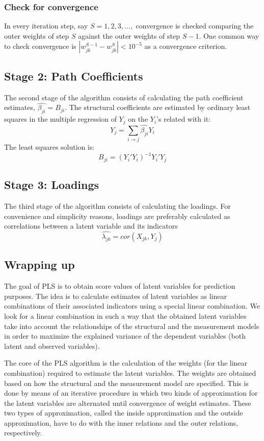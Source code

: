 \documentclass[12pt]{book}\usepackage{graphicx, color}
\begin{document}
\subsubsection*{Check for convergence}
In every iteration step, say $S = 1, 2, 3, \dots, $ convergence is checked comparing the outer weights of step $S$ against the outer weights of step $S-1$. One common way to check convergence is
$|w_{jk}^{S-1} - w_{jk}^{S}| < 10^{-5}$
as a convergence criterion.



\subsection{Stage 2: Path Coefficients}
The second stage of the algorithm consists of calculating the path coefficient estimates, $\widehat{\beta_{ji}} = B_{ji}$. The structural coefficients are estimated by ordinary least squares in the multiple regression of $Y_j$ on the $Y_i$'s related with it: 
$$ Y_j = \sum_{i \longrightarrow j} \widehat{\beta_{ji}} Y_i $$
The least squares solution is:
$$ B_{ji} = (Y_i' Y_i)^{-1} Y_i' Y_j $$


\subsection{Stage 3: Loadings}
The third stage of the algorithm consists of calculating the loadings. For convenience and simplicity reasons, loadings are preferably calculated as correlations between a latent variable and its indicators
$$ \widehat{\lambda_{jk}} = cor(X_{jk}, Y_j) $$



\subsection{Wrapping up}
The goal of PLS is to obtain score values of latent variables for prediction purposes. The idea is to calculate estimates of latent variables as linear combinations of their associated indicators using a special linear combination. We look for a linear combination in such a way that the obtained latent variables take into account the relationships of the structural and the measurement models in order to maximize the explained variance of the dependent variables (both latent and observed variables). 

The core of the PLS algorithm is the calculation of the weights (for the linear combination) required to estimate the latent variables. The weights are obtained based on how the structural and the measurement model are specified. This is done by means of an iterative procedure in which two kinds of approximation for the latent variables are alternated until convergence of weight estimates. These two types of approximation, called the inside approximation and the outside approximation, have to do with the inner relations and the outer relations, respectively.
\end{document}
